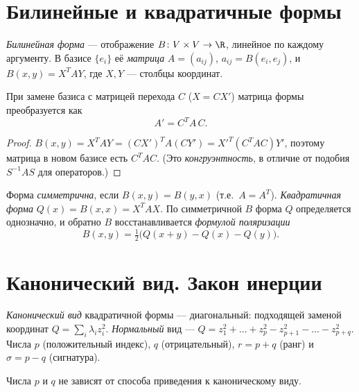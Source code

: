 \section{Билинейные и квадратичные формы}

\begin{definition}
\emph{Билинейная форма} — отображение $B\colon V\times V\to\R$, линейное по каждому аргументу. В
базисе $\{e_i\}$ её \emph{матрица} $A=(a_{ij})$, $a_{ij}=B(e_i,e_j)$, и
$B(x,y)=X^{T}AY$, где $X,Y$ — столбцы координат.
\end{definition}

\begin{theorem}
При замене базиса с матрицей перехода $C$ ($X=CX'$) матрица формы преобразуется как
\[
  A'=C^{T}A\,C .
\]
\end{theorem}

\begin{proof}
$B(x,y)=X^{T}AY=(CX')^{T}A(CY')=X'^{T}(C^{T}AC)Y'$, поэтому матрица в новом базисе есть $C^TAC$.
(Это \emph{конгруэнтность}, в отличие от подобия $S^{-1}AS$ для операторов.)
\end{proof}

\begin{definition}
Форма \emph{симметрична}, если $B(x,y)=B(y,x)$ (т.е.\ $A=A^{T}$). \emph{Квадратичная форма}
$Q(x)=B(x,x)=X^{T}AX$. По симметричной $B$ форма $Q$ определяется однозначно, и обратно $B$
восстанавливается \emph{формулой поляризации}
\[
  B(x,y)=\tfrac12\bigl(Q(x+y)-Q(x)-Q(y)\bigr).
\]
\end{definition}

\section{Канонический вид. Закон инерции}

\begin{definition}
\emph{Канонический вид} квадратичной формы — диагональный: подходящей заменой координат
$Q=\sum_i \lambda_i z_i^2$. \emph{Нормальный} вид —
$Q=z_1^2+\dots+z_p^2-z_{p+1}^2-\dots-z_{p+q}^2$. Числа $p$ (положительный индекс), $q$
(отрицательный), $r=p+q$ (ранг) и $\sigma=p-q$ (сигнатура).
\end{definition}

\begin{theorem}
Числа $p$ и $q$ не зависят от способа приведения к каноническому виду.
\end{theorem}


